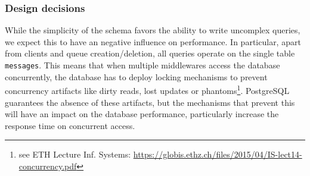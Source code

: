 \documentclass[11pt]{article}
\begin{document}
\subsubsection{Design decisions}\label{sec:design-decisions}
While the simplicity of the schema favors the ability to write uncomplex queries, we expect this to have an negative influence on performance.
In particular, apart from clients and queue creation/deletion, all queries operate on the single table \texttt{messages}. This means that when multiple middlewares access the database concurrently, the database has to deploy locking mechanisms to prevent concurrency artifacts like dirty reads, lost updates or phantoms\footnote{see ETH Lecture Inf. Systems: \url{https://globis.ethz.ch/files/2015/04/IS-lect14-concurrency.pdf}}. PostgreSQL guarantees the absence of these artifacts, but the mechanisms that prevent this will have an impact on the database performance, particularly increase the response time on concurrent access. 
\end{document}
